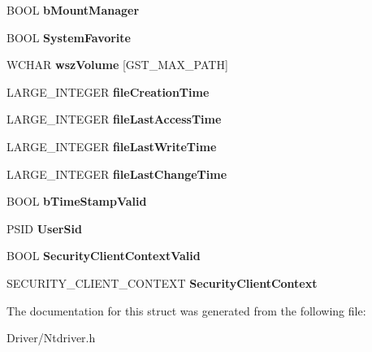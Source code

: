 \begin{DoxyCompactItemize}
B\+O\+OL {\bfseries b\+Mount\+Manager}
\item 
\mbox{\label{struct_e_x_t_e_n_s_i_o_n_a3a270d28c182c5ae8f70b6ddfd8c52ae}} 
B\+O\+OL {\bfseries System\+Favorite}
\item 
\mbox{\label{struct_e_x_t_e_n_s_i_o_n_a0535d6d75fb29e0d479fc3cc00c074aa}} 
W\+C\+H\+AR {\bfseries wsz\+Volume} \mbox{[}G\+S\+T\+\_\+\+M\+A\+X\+\_\+\+P\+A\+TH\mbox{]}
\item 
\mbox{\label{struct_e_x_t_e_n_s_i_o_n_a29eb9b8654e257bddbb0574be81c2e5b}} 
L\+A\+R\+G\+E\+\_\+\+I\+N\+T\+E\+G\+ER {\bfseries file\+Creation\+Time}
\item 
\mbox{\label{struct_e_x_t_e_n_s_i_o_n_a9b526df507ad28facbb3c63d3e5e2feb}} 
L\+A\+R\+G\+E\+\_\+\+I\+N\+T\+E\+G\+ER {\bfseries file\+Last\+Access\+Time}
\item 
\mbox{\label{struct_e_x_t_e_n_s_i_o_n_acd4f4e4044b4fdf2d3d6e884ec32b2de}} 
L\+A\+R\+G\+E\+\_\+\+I\+N\+T\+E\+G\+ER {\bfseries file\+Last\+Write\+Time}
\item 
\mbox{\label{struct_e_x_t_e_n_s_i_o_n_a4562119f9f3587e25298b2528113ec33}} 
L\+A\+R\+G\+E\+\_\+\+I\+N\+T\+E\+G\+ER {\bfseries file\+Last\+Change\+Time}
\item 
\mbox{\label{struct_e_x_t_e_n_s_i_o_n_a44ade2d60e555e6551918c51495422b4}} 
B\+O\+OL {\bfseries b\+Time\+Stamp\+Valid}
\item 
\mbox{\label{struct_e_x_t_e_n_s_i_o_n_a3528839f7133f28ef005a645a801cf93}} 
P\+S\+ID {\bfseries User\+Sid}
\item 
\mbox{\label{struct_e_x_t_e_n_s_i_o_n_ae91d0b56672112936e056257ce9a0bbf}} 
B\+O\+OL {\bfseries Security\+Client\+Context\+Valid}
\item 
\mbox{\label{struct_e_x_t_e_n_s_i_o_n_a612330b423564126e98e4304d0a7b1cc}} 
S\+E\+C\+U\+R\+I\+T\+Y\+\_\+\+C\+L\+I\+E\+N\+T\+\_\+\+C\+O\+N\+T\+E\+XT {\bfseries Security\+Client\+Context}
\end{DoxyCompactItemize}


The documentation for this struct was generated from the following file\+:\begin{DoxyCompactItemize}
\item 
Driver/Ntdriver.\+h\end{DoxyCompactItemize}
